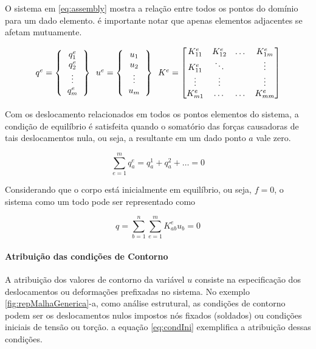   O sistema em \ref{eq:assembly} mostra a relação entre todos os pontos do domínio para um dado elemento. é importante notar que apenas elementos adjacentes se afetam mutuamente.
  
 \begin{equation}
 	\label{eq:assembly}
 	\begin{tabular}{c c c}
 	$q^e = 
		\left \{
 		\begin{tabular}{c}
	 		$q^e_1$ \\
	 		$q^e_2$ \\
	 		\vdots \\
	 		$q^e_m$
  		\end{tabular} 		
		\right \}$
		\
 	$u^e = 
		\left \{
 		\begin{tabular}{c}
	 		$u_1$ \\
	 		$u_2$ \\
	 		\vdots \\
	 		$u_m$
  		\end{tabular} 		
		\right \}	$
		\
		$K^e =
		\begin{bmatrix}
		    K^e_{11} 	& K^e_{12}  & \dots 	& K^e_{1m} \\
		    K^e_{11} 	& \ddots  & \ 	& \vdots \\
		    \vdots 	& \vdots  	 & \ 	& \vdots \\
		    K^e_{m1} 	& \dots   & \dots 	& K^e_{mm} 
		\end{bmatrix}	 $		
	\end{tabular} 
 \end{equation}
 
 Com os deslocamento relacionados em todos os pontos elementos do sistema,
 a condição de equilíbrio é satisfeita quando o somatório das forças causadoras de tais deslocamentos nula, ou seja, a resultante em um dado ponto $a$ vale zero.
 
  \begin{equation}
  	\label{eq:somaForcas}
 	\sum_{e=1}^{m}{q_a^e = q_a^1 + q_a^2 + \dots = 0}
  \end{equation}
  
  Considerando que o corpo está inicialmente em equilíbrio, ou seja, $f = 0$, o sistema como um todo pode ser representado como 
  
    \begin{equation}
    	\label{eq:equilibrio}
    	q =
   		\sum_{b=1}^{n}\sum_{e=1}^{m}{K_{ab}^e u_b = 0}
    \end{equation}
    
    
\paragraph{Atribuição das condições de Contorno \\}
A atribuição dos valores de contorno da variável $u$ consiste na especificação dos deslocamentos ou deformações prefixadas no sistema. No exemplo \ref{fig:repMalhaGenerica}-a, como análise estrutural, as condições de contorno podem ser os deslocamentos nulos impostos nós fixados (soldados) ou condições iniciais de tensão ou torção. a equação \ref{eq:condIni} exemplifica a atribuição dessas condições.

